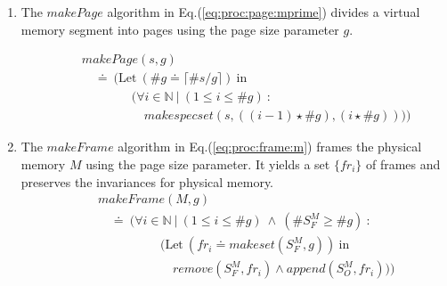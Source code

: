 \documentclass[draft]{article}
\def\names{\doteq}
\begin{document}
\begin{enumerate}
\begin{eqnarray}
      a_1, a_2, \ldots, a_k, a_{k+1})\right\})\ \mathrm{in}
    \nonumber \\
    &~& \quad \quad \quad \quad
    \bigl(\mathrm{Let}\ (s\ \names\ \left\{makeSegs(M^\prime,
    k, a_1, a_2, \ldots, a_k, a_{k+1})\right\})\ \mathrm{in}
    \nonumber \\
    &~& \quad \quad \quad \quad \quad \quad
    \bigl(\forall i \in \mathbb{N}\ \vert\ (1 \le i \le k)\ :\  
    bind (Sel(ps, i), Sel(s, i)) 
    \bigr)\bigr)\biggr)
  \end{eqnarray}
  Given    the    set   of    segments    of    the   procedure    $p$
  (Eq.\ref{eq:proc:segmenting}),  and  the  set  of  segments  in  the
  virtual           memory          (Eq.\ref{eq:proc:segment:mprime}),
  Eq.(\ref{eq:proc:build:seg:tab})  selects the $i^{th}$  segment from
  each and binds them together.

\item  The   $makePage$  algorithm  in  Eq.(\ref{eq:proc:page:mprime})
  divides  a virtual  memory segment  into pages  using the  page size
  parameter $g$.

  \begin{eqnarray}
    \label{eq:proc:page:mprime}
    &~&
    makePage(s, g)
    \nonumber \\
    &~& \quad
    \names\ \biggl(
    \mathrm{Let}\ (\#g \names \lceil \#s/g \rceil)\ \mathrm{in}\
    \nonumber \\
    &~& \quad \quad \quad \quad 
    \bigl(\forall i \in \mathbb{N}\ \vert\ (1 \le i \le \#g)\ :\  
    \nonumber \\
    &~& \quad \quad \quad \quad \quad
    makespecset(s, ((i-1) \star \#g), (i \star \#g))
    \bigr)\biggr)
  \end{eqnarray}
\item The  $makeFrame$ algorithm in  Eq.(\ref{eq:proc:frame:m}) frames
  the physical memory $M$ using  the page size parameter.  It yields a
  set $\{fr_i\}$  of frames and  preserves the invariances  for physical
  memory.
  \begin{eqnarray}
    \label{eq:proc:frame:m}
    &~&
    makeFrame(M, g)
    \nonumber \\
    &~& \quad
    \names\ \biggl(
    \forall i \in \mathbb{N}\ \vert\ (1 \le i \le \#g)\ \wedge\
    (\#S_F^M \ge \#g)\ :\  
    \nonumber \\
    &~& \quad \quad \quad \quad \quad
    (\mathrm{Let}\ (fr_i \names makeset(S_F^M, g))\ \mathrm{in}
    \nonumber \\
    &~& \quad \quad \quad \quad \quad \quad
    remove (S_F^M, fr_i) \wedge append(S_O^M, fr_i)
    \bigr)\biggr)
  \end{eqnarray}


\end{enumerate}
\end{document}
